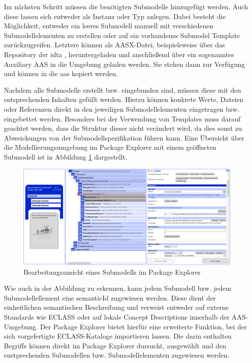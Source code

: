 Im nächsten Schritt müssen die benötigten Submodelle hinzugefügt werden. 
Auch diese lassen sich entweder als Instanz oder Typ anlegen.
Dabei besteht die Möglichkeit, entweder ein leeres Submodell manuell mit verschiedenen Submodellelementen zu erstellen oder auf ein vorhandenes Submodel Template zurückzugreifen.
Letztere können als AASX-Datei, beispielsweise über das Repository der \acs{idta} \cite{idtaTemplates}, heruntergeladen und anschließend über ein sogenanntes Auxiliary AAS in die Umgebung geladen werden.
Sie stehen dann zur Verfügung und können in die \acs{aas} kopiert werden.

Nachdem alle Submodelle erstellt bzw. eingebunden sind, müssen diese mit den entsprechenden Inhalten gefüllt werden.
Hierzu können konkrete Werte, Dateien oder Referenzen direkt in den jeweiligen Submodellelementen eingetragen bzw. eingebettet werden.
Besonders bei der Verwendung von Templates muss darauf geachtet werden, dass die Struktur dieser nicht verändert wird, da dies sonst zu Abweichungen von der Submodellspezifikation führen kann.
Eine Übersicht über die Modellierungsumgebung im Package Explorer mit einem geöffneten Submodell ist in Abbildung \ref{fig:BearbeitungsansichtPackageExplorer} dargestellt.

\begin{figure}[htbp]
    \centering
    \includegraphics[width=1\textwidth]{Bilder/ModellierungAAS/ModellierungMitDokumentation.PNG}
    \caption{Bearbeitungsansicht eines Submodells im Package Explorer}
    \label{fig:BearbeitungsansichtPackageExplorer}
\end{figure}

Wie auch in der Abbildung zu erkennen, kann jedem Submodell bzw. jedem Submodellellement eine semanticId zugewiesen werden.
Diese dient der einheitlichen semantischen Beschreibung und verweist entweder auf externe Standards wie ECLASS oder auf lokale Concept Descriptions innerhalb der AAS-Umgebung.
Der Package Explorer bietet hierfür eine erweiterte Funktion, bei der sich vorgefertigte ECLASS-Kataloge importieren lassen.
Die darin enthalten Begriffe können direkt im Package Explorer dursucht, ausgewählt und den enstprechenden Submodellen bzw. Submodellelementen zugewiesen werden.

